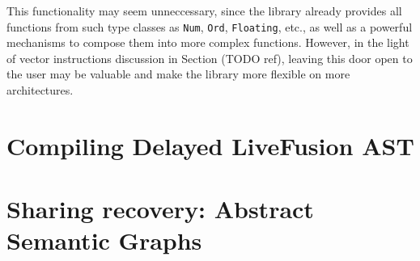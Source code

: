 \documentclass[preamble.tex]{subfiles}
\begin{document}
This functionality may seem unneccessary, since the library already provides all functions from such type classes as \texttt{Num}, \texttt{Ord}, \texttt{Floating}, etc., as well as a powerful mechanisms to compose them into more complex functions. However, in the light of vector instructions discussion in Section (TODO ref), leaving this door open to the user may be valuable and make the library more flexible on more architectures.



\pagebreak

\section{Compiling Delayed LiveFusion AST}

\section{Sharing recovery: Abstract Semantic Graphs}
\end{document}
